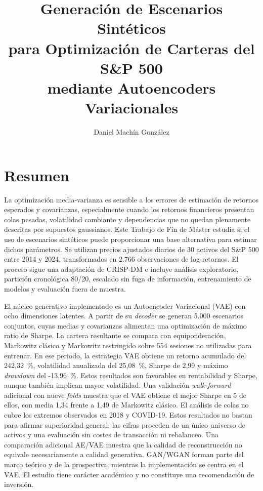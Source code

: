 \documentclass[11pt,a4paper,spanish]{book}
\title{Generación de Escenarios Sintéticos\\para \mbox{Optimización} de Carteras del S\&P 500\\mediante Autoencoders Variacionales}
\author{Daniel Machín González}
\date{\spanishdate{\year}{\month}{\day}}
\begin{document}
\maketitle

\frontmatter
\tableofcontents
\listoffigures
\listoftables

\chapter{Resumen}
La optimización media-varianza es sensible a los errores de estimación de retornos esperados y covarianzas, especialmente cuando los retornos financieros presentan colas pesadas, volatilidad cambiante y dependencias que no quedan plenamente descritas por supuestos gaussianos. Este Trabajo de Fin de Máster estudia si el uso de escenarios sintéticos puede proporcionar una base alternativa para estimar dichos parámetros. Se utilizan precios ajustados diarios de 30 activos del S\&P 500 entre 2014 y 2024, transformados en 2.766 observaciones de log-retornos. El proceso sigue una adaptación de CRISP-DM e incluye análisis exploratorio, partición cronológica 80/20, escalado sin fuga de información, entrenamiento de modelos y evaluación fuera de muestra.

El núcleo generativo implementado es un Autoencoder Variacional (VAE) con ocho dimensiones latentes. A partir de su \textit{decoder} se generan 5.000 escenarios conjuntos, cuyas medias y covarianzas alimentan una optimización de máximo ratio de Sharpe. La cartera resultante se compara con equiponderación, Markowitz clásico y Markowitz restringido sobre 554 sesiones no utilizadas para entrenar. En ese periodo, la estrategia VAE obtiene un retorno acumulado del 242,32~\%, volatilidad anualizada del 25,08~\%, Sharpe de 2,99 y máximo \textit{drawdown} del -13,96~\%. Estos resultados son favorables en rentabilidad y Sharpe, aunque también implican mayor volatilidad. Una validación \textit{walk-forward} adicional con nueve \textit{folds} muestra que el VAE obtiene el mejor Sharpe en 5 de ellos, con media 1,34 frente a 1,49 de Markowitz clásico. El análisis de colas no cubre los extremos observados en 2018 y COVID-19. Estos resultados no bastan para afirmar superioridad general: las cifras proceden de un único universo de activos y una evaluación sin costes de transacción ni rebalanceo. Una comparación adicional AE/VAE muestra que la calidad de reconstrucción no equivale necesariamente a calidad generativa. GAN/WGAN forman parte del marco teórico y de la prospectiva, mientras la implementación se centra en el VAE. El estudio tiene carácter académico y no constituye una recomendación de inversión.
\end{document}
